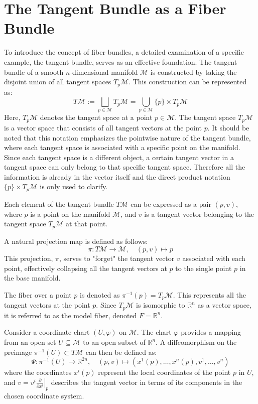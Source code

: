 \section{The Tangent Bundle as a Fiber Bundle}

To introduce the concept of fiber bundles, a detailed examination of a specific example, the tangent bundle, serves as an effective foundation.
The tangent bundle of a smooth \( n \)-dimensional manifold \( \mathcal{M} \) is constructed by taking the disjoint union of all tangent spaces \( T_p\mathcal{M} \). This construction can be represented as:
\[
T\mathcal{M} := \bigsqcup_{p \in \mathcal{M}} T_p\mathcal{M} = \bigcup_{p \in \mathcal{M}} \{p\} \times T_p\mathcal{M}
\]
Here, \( T_p\mathcal{M} \) denotes the tangent space at a point \( p \in \mathcal{M} \). The tangent space \( T_p\mathcal{M} \) is a vector space that consists of all tangent vectors at the point \( p \). It should be noted that this notation emphasizes the pointwise nature of the tangent bundle, where each tangent space is associated with a specific point on the manifold. Since each tangent space is a different object, a certain tangent vector in a tangent space can only belong to that specific tangent space. Therefore all the information is already in the vector itself and the direct product notation \( \{p\} \times T_p\mathcal{M} \) is only used to clarify\cite{FredericSchullerTopologicalmanifoldsmanifoldbundlesLec06FredericSchuller2015}.

Each element of the tangent bundle \( T\mathcal{M} \) can be expressed as a pair \( (p, v) \), where \( p \) is a point on the manifold \( \mathcal{M} \), and \( v \) is a tangent vector belonging to the tangent space \( T_p\mathcal{M} \) at that point. 

A natural projection map is defined as follows:
\[
\pi: T\mathcal{M} \to \mathcal{M}, \quad (p, v) \mapsto p
\]
This projection, \( \pi \), serves to "forget" the tangent vector \( v \) associated with each point, effectively collapsing all the tangent vectors at \( p \) to the single point \( p \) in the base manifold\cite{NakaharaGeometrytopologyphysics2005}.

The fiber over a point \( p \) is denoted as \( \pi^{-1}(p) = T_p\mathcal{M} \). This represents all the tangent vectors at the point \( p \). Since \( T_p\mathcal{M} \) is isomorphic to \( \mathbb{R}^n \) as a vector space, it is referred to as the model fiber, denoted \( F = \mathbb{R}^n \)\cite{NakaharaGeometrytopologyphysics2005}.

Consider a coordinate chart \( (U, \varphi) \) on \( \mathcal{M} \). The chart \( \varphi \) provides a mapping from an open set \( U \subseteq \mathcal{M} \) to an open subset of \( \mathbb{R}^n \). A diffeomorphism on the preimage \( \pi^{-1}(U) \subset T\mathcal{M} \) can then be defined as:
\[
\Psi: \pi^{-1}(U) \to \mathbb{R}^{2n}, \quad (p, v) \mapsto \left(x^1(p), \dots, x^n(p), v^1, \dots, v^n \right)
\]
where the coordinates \( x^i(p) \) represent the local coordinates of the point \( p \) in \( U \), and \( v = v^i \left. \frac{\partial}{\partial x^i} \right|_p \) describes the tangent vector in terms of its components in the chosen coordinate system\cite{NakaharaGeometrytopologyphysics2005}.

